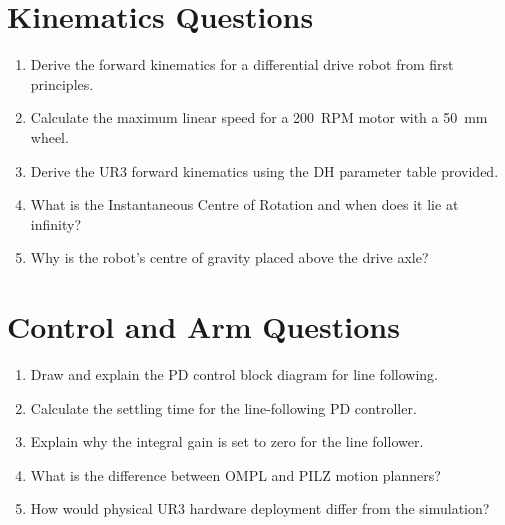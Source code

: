\documentclass[12pt,a4paper,oneside]{report}
\begin{document}
\section*{Kinematics Questions}

\begin{enumerate}
\item Derive the forward kinematics for a differential drive robot from first principles.
\item Calculate the maximum linear speed for a 200~RPM motor with a 50~mm wheel.
\item Derive the UR3 forward kinematics using the DH parameter table provided.
\item What is the Instantaneous Centre of Rotation and when does it lie at infinity?
\item Why is the robot's centre of gravity placed above the drive axle?
\end{enumerate}

\section*{Control and Arm Questions}

\begin{enumerate}
\item Draw and explain the PD control block diagram for line following.
\item Calculate the settling time for the line-following PD controller.
\item Explain why the integral gain is set to zero for the line follower.
\item What is the difference between OMPL and PILZ motion planners?
\item How would physical UR3 hardware deployment differ from the simulation?
\end{enumerate}
\end{document}
